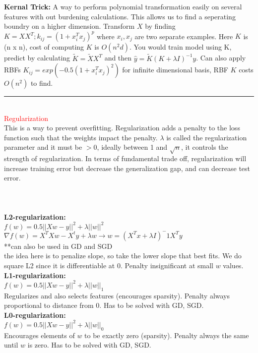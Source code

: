 \documentclass[8pt]{extarticle}
\begin{document}
\begin{multicols*}{2}
\textbf{Kernal Trick:} A way to perform polynomial transformation easily on several features with out burdening calculations. This allows us to find a seperating boundry on a higher dimension. Transform $X$ by finding $K = XX^T; k_{ij} = (1+x_i^Tx_j)^p$ where $x_i, x_j$ are two separate examples. Here $K$ is (n x n), cost of computing $K$ is $O(n^2d)$. You would train model using K, predict by calculating $\tilde{K} = \tilde{X}X^T$ and then $\hat{y} = \tilde{K}(K+\lambda I)^{-1}y$. Can also apply RBFs $K_{ij} = exp(-0.5(1+x_i^Tx_j)^2)$ for infinite dimensional basis, RBF $K$ costs $O(n^2)$ to find.
\\
\rule{\linewidth}{0.5mm} 
\\
\textcolor{red}{Regularization}
\\
This is a way to prevent overfitting. Regularization adds a penalty to the loss function such that the weights impact the penalty. $\lambda$ is called the regularization parameter and it must be $>0$, ideally between 1 and $\sqrt{n}$, it controls the strength of regularization. In terms of fundamental trade off, regularization will increase training error but decrease the generalization gap, and can decrease test error. 
\\\\\\\\
\textbf{L2-regularization:}
\\
$f(w) = 0.5||Xw-y||^2+\lambda||w||^2$ 
\\
$\nabla f(w) = X^TXw-X^ty + \lambda w \rightarrow w = (X^Tx+\lambda I)^-1X^Ty$
\\
**can also be used in GD and SGD
\\
the idea here is to penalize slope, so take the lower slope that best fits. We do square L2 since it is differentiable at 0. Penalty insignificant at small $w$ values.
\\
\textbf{L1-regularization:}
\\
$f(w) = 0.5||Xw-y||^2+\lambda||w||_1$ 
\\
Regularizes and also selects features (encourages sparsity). Penalty always proportional to distance from 0. Has to be solved with GD, SGD.
\\ 
\textbf{L0-regularization:}
\\
$f(w) = 0.5||Xw-y||^2+\lambda||w||_0$
\\
Encourages elements of $w$ to be exactly zero (sparsity). Penalty always the same until $w$ is zero. Has to be solved with GD, SGD.
\\

\end{multicols*}
\end{document}
